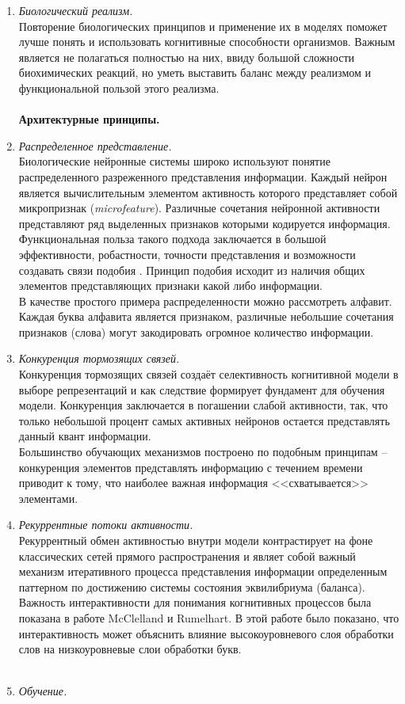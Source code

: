 \documentclass[a4paper,10pt]{article}
\begin{document}
\begin{enumerate}
\item \textit{Биологический реализм.} \\
Повторение биологических принципов и применение их в моделях поможет лучше понять и использовать когнитивные способности организмов. Важным является не полагаться полностью на них, ввиду большой сложности биохимических реакций, но уметь выставить баланс между реализмом и функциональной пользой этого реализма. \\
\indent \\
\textbf{Архитектурные принципы.}
\item \textit{Распределенное представление.} \\
Биологические нейронные системы широко используют понятие распределенного разреженного представления информации. Каждый нейрон является вычислительным элементом активность которого представляет собой микропризнак (\textit{microfeature}). Различные сочетания нейронной активности представляют ряд выделенных признаков которыми кодируется информация. Функциональная польза такого подхода заключается в большой эффективности, робастности, точности представления и возможности создавать связи подобия \cite{hinton86}. Принцип подобия исходит из наличия общих элементов представляющих признаки какой либо информации. \\ 
В качестве простого примера распределенности можно рассмотреть алфавит. Каждая буква алфавита является признаком, различные небольшие сочетания признаков (слова) могут закодировать огромное количество информации.
\item \textit{Конкуренция тормозящих связей.}\\
Конкуренция тормозящих связей создаёт селективность когнитивной модели в выборе репрезентаций и как следствие формирует фундамент для обучения модели. Конкуренция заключается в погашении слабой активности, так, что только небольшой процент самых активных нейронов остается представлять данный квант информации.\\
Большинство обучающих механизмов построено по подобным принципам --  конкуренция элементов представлять информацию с течением времени приводит к тому, что наиболее важная информация <<схватывается>>   элементами.
\item \textit{Рекуррентные потоки активности.}\\
Рекуррентный обмен активностью внутри модели контрастирует на фоне классических сетей прямого распространения и являет собой важный механизм итеративного процесса представления информации определенным паттерном по достижению системы состояния эквилибриума (баланса).\\
Важность интерактивности для понимания когнитивных процессов была показана в работе McClelland и Rumelhart\cite{mcclel_rumer}. В этой работе было показано, что интерактивность может объяснить влияние высокоуровневого слоя обработки слов на низкоуровневые слои обработки букв.  \\
\indent \\
\item \textit{Обучение.}

\end{enumerate}
\end{document}
